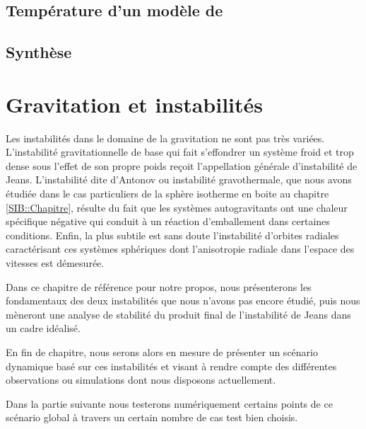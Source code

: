 
	\section{Température d'un modèle de \King \label{sec::temp}}
		

	\section{Synthèse}
		


\chapter{Gravitation et instabilités}
Les instabilités dans le domaine de la gravitation ne sont pas très variées. L'instabilité gravitationnelle de base qui fait s'effondrer un système froid et trop dense sous l'effet de son propre poids reçoit l'appellation générale d'instabilité de Jeans. L'instabilité dite d'Antonov ou instabilité gravothermale, que nous avons étudiée dans le cas particuliers de la sphère isotherme en boite au chapitre \ref{SIB::Chapitre}, résulte du fait que les systèmes autogravitants ont une chaleur spécifique négative qui conduit à un réaction d'emballement dans certaines conditions. Enfin, la plus subtile est sans doute l'instabilité d'orbites radiales caractérisant ces systèmes sphériques dont l'anisotropie radiale dans l'espace des vitesses est démesurée.

Dans ce chapitre de référence pour notre propos, nous présenterons les fondamentaux des deux instabilités que nous n'avons pas encore étudié, puis nous mèneront une analyse de stabilité du produit final de l'instabilité de Jeans dans un cadre idéalisé.

En fin de chapitre, nous serons alors en mesure de présenter un scénario dynamique basé sur ces instabilités et visant à rendre compte des différentes observations ou simulations dont nous disposons actuellement.

Dans la partie suivante nous testerons numériquement certains points de ce scénario global à travers un certain nombre de cas test bien choisis.
 
 



